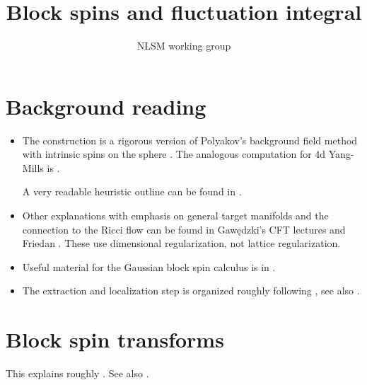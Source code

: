 \documentclass[11pt]{article}
\title{Block spins and fluctuation integral}
\author{NLSM working group}
\date{}
\numberwithin{equation}{section}
\theoremstyle{definition}
\theoremstyle{plain}
\begin{document}
\maketitle
{}

\setcounter{tocdepth}{1}
\tableofcontents


\newpage
\section{Background reading}

\begin{itemize}
\item 
The construction is a rigorous version of Polyakov's background field method with intrinsic spins on the sphere
\cite[Section~2.2]{MR1122810}.
The analogous computation for 4d Yang-Mills is \cite[Section~2.3]{MR1122810}.


A very readable heuristic outline can be found in \cite[Section~4.3]{Tong-StatisticalFieldTheory}.

\item
Other explanations with emphasis on general target manifolds and the connection
to the Ricci flow can be found in Gaw{\k{e}}dzki's CFT lectures \cite{MR1701610}
and Friedan \cite{Friedan1980,MR811072}. These use dimensional regularization,
not lattice regularization.

\item 
Useful material for the Gaussian block spin calculus is in \cite{MR588686}.


\item
The extraction and localization step is organized roughly following
\cite{MR3332939}, see also \cite{MR3969983}.


\end{itemize}

\newpage
\section{Block spin transforms}
\label{sec:block-gauss}

This explains roughly \cite[Section~3.2]{OpenAI-O3}. See also \cite{MR588686}.
\end{document}
